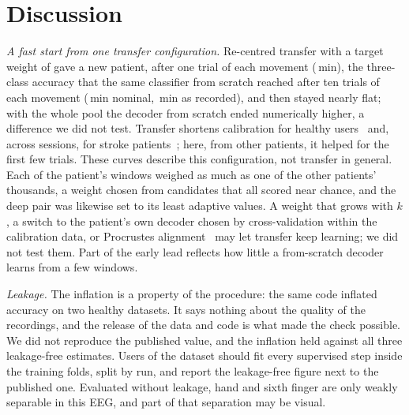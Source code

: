 \section{Discussion}
\label{sec:discussion}

\emph{A fast start from one transfer configuration.} Re-centred transfer with
a target weight of \rqTwoHparamRctTslrWeight{} gave a new patient, after one
trial of each movement (\rqTwoMinutesKOne\,min), the three-class accuracy that
the same classifier from scratch reached after ten trials of each movement
(\rqTwoMinutesKTen\,min nominal, \rqTwoMinutesRecordedKTen\,min as recorded),
and then stayed nearly flat; with the whole pool the decoder from scratch
ended numerically higher, a difference we did not test. Transfer shortens
calibration for healthy users~\cite{zanini2018,he2020,wu2022review} and, across
sessions, for stroke patients~\cite{giles2022,cao2021}; here, from other
patients, it helped for the first few trials. These curves describe this
configuration, not transfer in general. Each of the patient's windows weighed
as much as one of the other patients' thousands, a weight chosen from
candidates that all scored near chance, and the deep pair was likewise set to
its least adaptive values. A weight that grows with $k$, a switch to the patient's own decoder chosen by cross-validation
within the calibration data, or Procrustes alignment~\cite{rodrigues2019} may
let transfer keep learning; we did not test them. Part of the early lead
reflects how little a from-scratch decoder learns from a few windows.

\emph{Leakage.} The inflation is a property of the procedure: the same code
inflated accuracy on two healthy datasets. It says nothing about the quality
of the recordings, and the release of the data and code is what made the
check possible. We did not reproduce the published value, and the inflation
held against all three leakage-free estimates. Users of the dataset should
fit every supervised step inside the training folds, split by run, and report
the leakage-free figure next to the published one. Evaluated without leakage,
hand and sixth finger are only weakly separable in this EEG, and part of that
separation may be visual.

